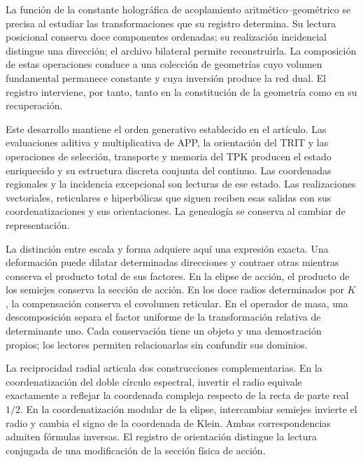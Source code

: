 \label{rec:apertura}

La función de la constante holográfica de acoplamiento aritmético--geométrico se precisa al estudiar las transformaciones que su registro determina. Su lectura posicional conserva doce componentes ordenadas; su realización incidencial distingue una dirección; el archivo bilateral permite reconstruirla. La composición de estas operaciones conduce a una colección de geometrías cuyo volumen fundamental permanece constante y cuya inversión produce la red dual. El registro interviene, por tanto, tanto en la constitución de la geometría como en su recuperación.

Este desarrollo mantiene el orden generativo establecido en el artículo. Las evaluaciones aditiva y multiplicativa de APP, la orientación del TRIT y las operaciones de selección, transporte y memoria del TPK producen el estado enriquecido y su estructura discreta conjunta del continuo. Las coordenadas regionales y la incidencia excepcional son lecturas de ese estado. Las realizaciones vectoriales, reticulares e hiperbólicas que siguen reciben esas salidas con sus coordenatizaciones y sus orientaciones. La genealogía se conserva al cambiar de representación.

La distinción entre escala y forma adquiere aquí una expresión exacta. Una deformación puede dilatar determinadas direcciones y contraer otras mientras conserva el producto total de sus factores. En la elipse de acción, el producto de los semiejes conserva la sección de acción. En los doce radios determinados por \(K\), la compensación conserva el covolumen reticular. En el operador de masa, una descomposición separa el factor uniforme de la transformación relativa de determinante uno. Cada conservación tiene un objeto y una demostración propios; los lectores permiten relacionarlas sin confundir sus dominios.

La reciprocidad radial articula dos construcciones complementarias. En la coordenatización del doble círculo espectral, invertir el radio equivale exactamente a reflejar la coordenada compleja respecto de la recta de parte real \(1/2\). En la coordenatización modular de la elipse, intercambiar semiejes invierte el radio y cambia el signo de la coordenada de Klein. Ambas correspondencias admiten fórmulas inversas. El registro de orientación distingue la lectura conjugada de una modificación de la sección física de acción.

